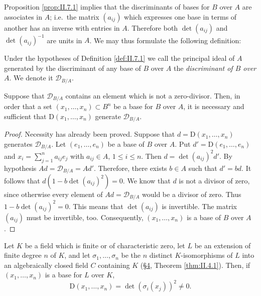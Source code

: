 Proposition \ref{prop:II.7.1} implies that the discriminants of bases for
$B$ over $A$ are associates in $A$; i.e.\ the matrix $(a_{ij})$ which
expresses one base in terms of another has an inverse with entries in $A$.
Therefore both $\det(a_{ij})$ and $\det(a_{ij})^{-1}$ are units in $A$. We
may thus formulate the following definition:

\begin{definition}
\label{def:II.7.2}
Under the hypotheses of Definition \ref{def:II.7.1} we call the principal
ideal of $A$ generated by the discriminant of any base of $B$ over $A$ the
\emph{discriminant of $B$ over $A$}. We denote it
$\mathcal{D}_{B/A}$.
\end{definition}

\begin{proposition}
\label{prop:II.7.2}
Suppose that $\mathcal{D}_{B/A}$ contains an element which is not a
zero-divisor. Then, in order that a set
$(x_{1},\ldots,x_{n})\subset B^{n}$ be a base for $B$ over $A$, it is
necessary and sufficient that $\mathrm{D}(x_{1},\ldots,x_{n})$ generate
$\mathcal{D}_{B/A}$.
\end{proposition}

\begin{proof}
Necessity has already been proved. Suppose that
$d=\mathrm{D}(x_{1},\ldots,x_{n})$ generates $\mathcal{D}_{B/A}$. Let
$(e_{1},\ldots,e_{n})$ be a base of $B$ over $A$. Put
$d'=\mathrm{D}(e_{1},\ldots,e_{n})$ and
$x_{i}=\sum_{j=1}^{n}a_{ij}e_{j}$ with $a_{ij}\in A$, $1\leq i\leq n$. Then
$d=\det(a_{ij})^{2}d'$. By hypothesis $Ad=\mathcal{D}_{B/A}=Ad'$. Therefore,
there exists $b\in A$ such that $d'=bd$. It follows that
$d(1-b\det(a_{ij})^{2})=0$. We know that $d$ is not a divisor of zero, since
otherwise every element of $Ad=\mathcal{D}_{B/A}$ would be a divisor of
zero. Thus $1-b\det(a_{ij})^{2}=0$. This means that $\det(a_{ij})$ is
invertible. The matrix $(a_{ij})$ must be invertible, too. Consequently,
$(x_{1},\ldots,x_{n})$ is a base of $B$ over $A$.
\end{proof}

\begin{proposition}
\label{prop:II.7.3}
Let $K$ be a field which is finite or of characteristic zero, let $L$ be an
extension of finite degree $n$ of $K$, and let $\sigma_{1},\ldots,\sigma_{n}$
be the $n$ distinct $K$-isomorphisms of $L$ into an algebraically closed
field $C$ containing $K$ (\hyperref[sec:2.4]{§4}, Theorem \ref{thm:II.4.1}). Then, if
$(x_{1},\ldots,x_{n})$ is a base for $L$ over $K$,
\begin{equation}
\mathrm{D}(x_{1},\ldots,x_{n})=\det(\sigma_{i}(x_{j}))^{2}\neq0.
\label{eq:II.7.3}
\end{equation}
\end{proposition}

